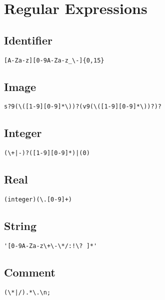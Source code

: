 \section{Regular Expressions}

\subsection{Identifier}

\begin{verbatim}
[A-Za-z][0-9A-Za-z_\-]{0,15}
\end{verbatim}


\subsection{Image}

\begin{verbatim}
s?9(\([1-9][0-9]*\))?(v9(\([1-9][0-9]*\))?)?
\end{verbatim}


\subsection{Integer}

\begin{verbatim}
(\+|-)?([1-9][0-9]*)|(0)
\end{verbatim}


\subsection{Real}

\begin{verbatim}
(integer)(\.[0-9]+)
\end{verbatim}


\subsection{String}

\begin{verbatim}
'[0-9A-Za-z\+\-\*/:!\? ]*'
\end{verbatim}


\subsection{Comment}

\begin{verbatim}
(\*|/).*\.\n;
\end{verbatim}